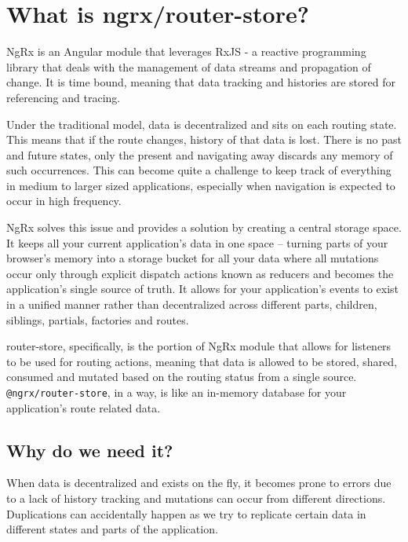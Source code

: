 \maketitle{}
\section{ What is ngrx/router-store? }

NgRx is an Angular module that leverages RxJS -  a reactive programming library
that deals with the management of data streams and propagation of change. It is
time bound, meaning that data tracking and histories are stored for referencing
and tracing.

Under the traditional model, data is decentralized and sits on each routing
state. This means that if the route changes, history of that data is lost. There
is no past and future states, only the present and navigating away discards any
memory of such occurrences. This can become quite a challenge to keep track of
everything in medium to larger sized applications, especially when navigation
is expected to occur in high frequency.

NgRx solves this issue and provides a solution by creating a central storage
space. It keeps all your current application’s data in one space – turning parts
of your browser’s memory into a  storage bucket for all your data where all
mutations occur only through explicit dispatch actions known as reducers and
becomes the application’s single source of truth. It allows for your
application’s events to exist in a unified manner rather than decentralized
across different parts, children, siblings, partials, factories and routes.

router-store, specifically, is the portion of NgRx module that allows for
listeners to be used for routing actions, meaning that data is allowed to be
stored, shared, consumed and mutated based on the routing status from
a single source. \texttt{@ngrx/router-store}, in a way, is like an in-memory database
for your application’s route related data.

\subsection{Why do we need it?}
When data is decentralized and exists on the fly, it becomes prone to errors due
to a lack of history tracking and mutations can occur from different directions.
Duplications can accidentally happen as we try to replicate certain data in
different states and parts of the application.

